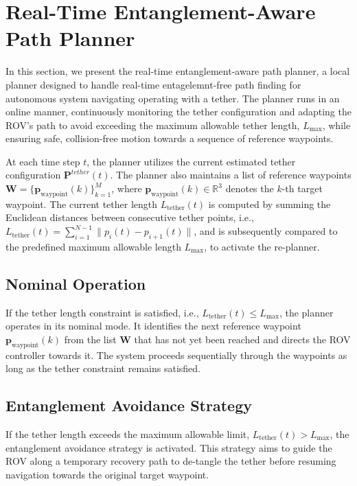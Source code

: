 

\section{Real-Time Entanglement-Aware Path Planner}
\label{sec:planner}

In this section, we present the real-time entanglement-aware path planner, a local planner designed to handle real-time entagelemnt-free path finding for autonomous system navigating operating with a tether. The planner runs in an online manner, continuously monitoring the tether configuration and adapting the \ac{ROV}'s path to avoid exceeding the maximum allowable tether length, \( L_{\text{max}} \), while ensuring safe, collision-free motion towards a sequence of reference waypoints.

At each time step \( t \), the planner utilizes the current estimated tether configuration  $\mathbf{P}^{tether}(t)$. The planner also maintains a list of reference waypoints \( \mathbf{W} = \{\mathbf{p}_{\text{waypoint}}(k)\}_{k=1}^{M} \), where \( \mathbf{p}_{\text{waypoint}}(k) \in \mathbb{R}^3 \) denotes the \( k \)-th target waypoint. The current tether length \( L_{\text{tether}}(t) \) is computed by summing the Euclidean distances between consecutive tether points, i.e., \( L_{\text{tether}}(t) = \sum_{i=1}^{N-1} \| p_i(t) - p_{i+1}(t) \| \), and is subsequently compared to the predefined maximum allowable length \( L_{\text{max}} \), to activate the re-planner.

\subsection{Nominal Operation}
If the tether length constraint is satisfied, i.e., \( L_{\text{tether}}(t) \leq L_{\text{max}} \), the planner operates in its nominal mode. It identifies the next reference waypoint \( \mathbf{p}_{\text{waypoint}}(k) \) from the list \( \mathbf{W} \) that has not yet been reached and directs the \ac{ROV} controller towards it. The system proceeds sequentially through the waypoints as long as the tether constraint remains satisfied.



\subsection{Entanglement Avoidance Strategy}
If the tether length exceeds the maximum allowable limit, \( L_{\text{tether}}(t) > L_{\text{max}} \), the entanglement avoidance strategy is activated. This strategy aims to guide the \ac{ROV} along a temporary recovery path to de-tangle the tether before resuming navigation towards the original target waypoint.

